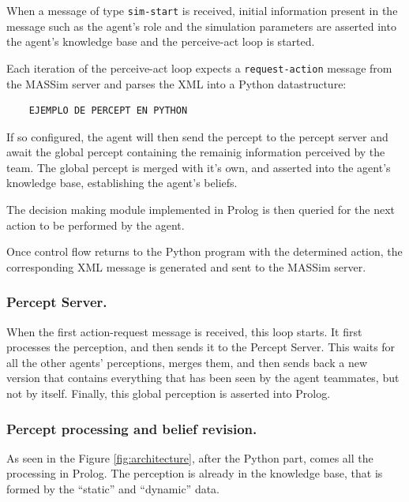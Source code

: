     When a message of type \texttt{sim-start} is received, initial information
    present in the message such as the agent's role and the simulation
    parameters are asserted into the agent's knowledge base and the perceive-act
    loop is started.

    Each iteration of the perceive-act loop expects a \texttt{request-action}
    message from the MASSim server and parses the XML into a Python
    datastructure:

    \begin{verbatim}
    EJEMPLO DE PERCEPT EN PYTHON
    \end{verbatim}
    
    If so configured, the agent will then send the percept to the percept server
    and await the global percept containing the remainig information perceived
    by the team. The global percept is merged with it's own, and asserted into
    the agent's knowledge base, establishing the agent's beliefs.

    The decision making module implemented in Prolog is then queried for the
    next action to be performed by the agent.
    
    Once control flow returns to the Python program with the determined action,
    the corresponding XML message is generated and sent to the MASSim server. 


\subsubsection{Percept Server.}
    When the first action-request message is received, this loop starts. It 
    first processes the perception, and then sends it to the Percept Server. 
    This waits for all the other agents' perceptions, merges them, and then sends 
    back a new version that contains everything that has been seen by the agent 
    teammates, but not by itself. Finally, this global perception is asserted 
    into Prolog. 


\subsubsection{Percept processing and belief revision.}
    As seen in the Figure \ref{fig:architecture}, after the Python part, comes 
    all the processing in Prolog. The perception is already in the knowledge 
    base, that is formed by the ``static'' and ``dynamic'' data. 

